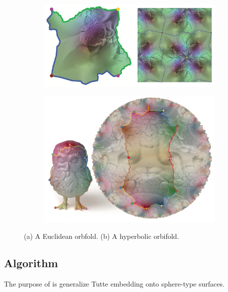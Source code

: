 \begin{figure}
\centering
\begin{subfigure}{0.5\textwidth}
\includegraphics[width=\textwidth]{images/euc_orbifold}
\caption{}
\end{subfigure}
\begin{subfigure}{0.4\textwidth}
\includegraphics[width = \textwidth]{images/hyperbolic}
\caption{}
\label{fig:hyper-orbifold}
\end{subfigure}
\caption{(a) A Euclidean orbfold. (b) A hyperbolic orbifold.}
\label{fig:tile}
\end{figure}

\subsection{Algorithm}

The purpose of \cite{Aigerman:2015:OTE:2816795.2818099}\cite{Aigerman:2016:HOT:2980179.2982412} is generalize Tutte embedding onto sphere-type surfaces.

